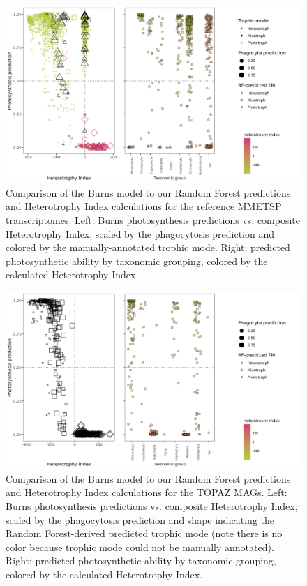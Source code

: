 \documentclass[12pt]{article}
\numberwithin{equation}{section}
\begin{document}
\begin{figure}
    \centering
    \includegraphics[width=0.95\columnwidth]{si-figures/mmetsp_burns.png}
    \caption{Comparison of the Burns \citep{burns2018gene} model to our Random Forest predictions and Heterotrophy Index calculations for the reference MMETSP transcriptomes. Left: Burns \cite{burns2018gene} photosynthesis predictions vs. composite Heterotrophy Index, scaled by the phagocytosis prediction and colored by the manually-annotated trophic mode. Right: predicted photosynthetic ability by taxonomic grouping, colored by the calculated Heterotrophy Index.}
    \label{fig:mmetsp-burns}
\end{figure}

\begin{figure}
    \centering
    \includegraphics[width=0.95\columnwidth]{si-figures/mag_burns.png}
    \caption{Comparison of the Burns \citep{burns2018gene} model to our Random Forest predictions and Heterotrophy Index calculations for the TOPAZ MAGs. Left: Burns \cite{burns2018gene} photosynthesis predictions vs. composite Heterotrophy Index, scaled by the phagocytosis prediction and shape indicating the Random Forest-derived predicted trophic mode (note there is no color because trophic mode could not be manually annotated). Right: predicted photosynthetic ability by taxonomic grouping, colored by the calculated Heterotrophy Index.}
    \label{fig:mag-burns}
\end{figure}
\end{document}
